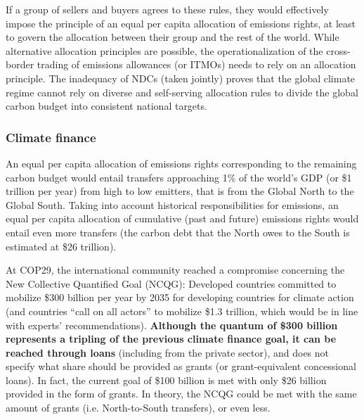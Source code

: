 \documentclass[12pt,english]{article}
\begin{document}
If a group of sellers and buyers agrees to these rules, they would effectively impose the principle of an equal per capita allocation of emissions rights, at least to govern the allocation between their group and the rest of the world. While alternative allocation principles are possible, the operationalization of the cross-border trading of emissions allowances (or ITMOs) needs to rely on an allocation principle. The inadequacy of NDCs (taken jointly) proves that the global climate regime cannot rely on diverse and self-serving allocation rules to divide the global carbon budget into consistent national targets. 


\subsubsection{Climate finance\label{subsubsec:finance}}

An equal per capita allocation of emissions rights corresponding to the remaining carbon budget would entail transfers approaching 1\% of the world's GDP (or \$1 trillion per year) from high to low emitters, that is from the Global North to the Global South. Taking into account historical responsibilities for emissions, an equal per capita allocation of cumulative (past and future) emissions rights would entail even more transfers (the carbon debt that the North owes to the South is estimated at \$26 trillion\cite{fabre_global_2024}). 

At COP29, the international community reached a compromise concerning the New Collective Quantified Goal (NCQG): Developed countries committed to mobilize \$300 billion per year by 2035 for developing countries for climate action (and countries ``call on all actors'' to mobilize \$1.3 trillion, which would be in line with experts' recommendations\cite{unfccc_new_2024,songwe_raising_2024}). \textbf{Although the quantum of \$300 billion represents a tripling of the previous climate finance goal, it can be reached through loans} (including from the private sector), and does not specify what share should be provided as grants (or grant-equivalent concessional loans). In fact, the current goal of \$100 billion is met with only \$26 billion provided in the form of grants. In theory, the NCQG could be met with the same amount of grants (i.e. North-to-South transfers), or even less. 
\end{document}
